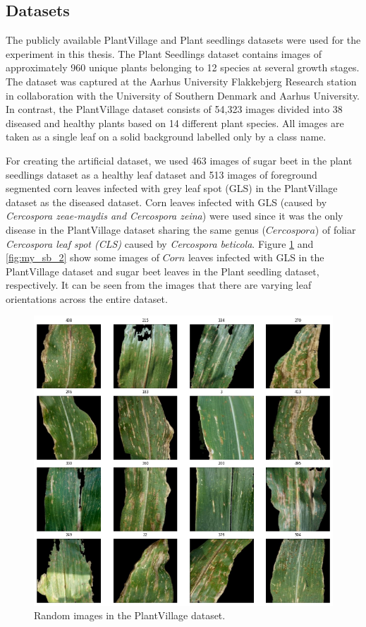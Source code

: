 \subsection*{Datasets}
The publicly available PlantVillage \cite{hughes2015open} and Plant seedlings \cite{Giselsson2017} datasets were used for the experiment in this thesis. The Plant Seedlings dataset contains images of approximately 960 unique plants belonging to 12 species at several growth stages. The dataset was captured at the Aarhus University Flakkebjerg Research station in collaboration with the University of Southern Denmark and Aarhus University. In contrast, the PlantVillage dataset consists of 54,323 images divided into 38 diseased and healthy plants based on 14 different plant species. All images are taken as a single leaf on a solid background labelled only by a class name.

For creating the artificial dataset, we used 463 images of sugar beet in the plant seedlings dataset as a healthy leaf dataset and 513 images of foreground segmented corn leaves infected with grey leaf spot (GLS) in the PlantVillage dataset as the diseased dataset.
Corn leaves infected with GLS (caused by \textit{Cercospora zeae-maydis and Cercospora zeina}) were used since it was the only disease in the PlantVillage dataset sharing the same genus ($Cercospora$) of foliar \textit{Cercospora leaf spot (CLS)} caused by \textit{Cercospora beticola}. Figure \ref{fig:my_dis3} and \ref{fig:my_sb_2} show some images of $Corn$ leaves infected with GLS in the PlantVillage dataset and sugar beet leaves in the Plant seedling dataset, respectively. It can be seen from the images that there are varying leaf orientations across the entire dataset.


\begin{figure}[!htb]
    \centering
    \includegraphics[scale=0.65, keepaspectratio]{Figures/notebook/dis-seg-2.png}
    \caption{Random images in the PlantVillage dataset.}
    \label{fig:my_dis3}
\end{figure}

